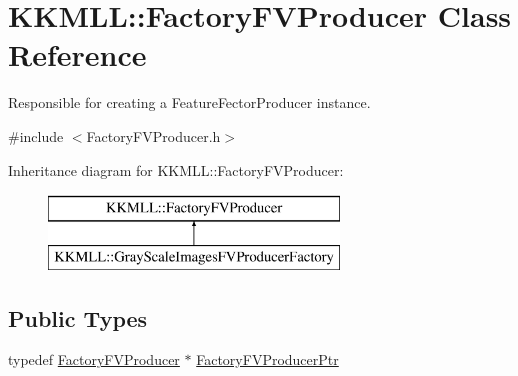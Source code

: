 \hypertarget{class_k_k_m_l_l_1_1_factory_f_v_producer}{}\section{K\+K\+M\+LL\+:\+:Factory\+F\+V\+Producer Class Reference}
\label{class_k_k_m_l_l_1_1_factory_f_v_producer}


Responsible for creating a Feature\+Fector\+Producer instance.  




{\ttfamily \#include $<$Factory\+F\+V\+Producer.\+h$>$}

Inheritance diagram for K\+K\+M\+LL\+:\+:Factory\+F\+V\+Producer\+:\begin{figure}[H]
\begin{center}
\leavevmode
\includegraphics[height=2.000000cm]{class_k_k_m_l_l_1_1_factory_f_v_producer}
\end{center}
\end{figure}
\subsection*{Public Types}
\begin{DoxyCompactItemize}
\item 
typedef \hyperlink{class_k_k_m_l_l_1_1_factory_f_v_producer}{Factory\+F\+V\+Producer} $\ast$ \hyperlink{class_k_k_m_l_l_1_1_factory_f_v_producer_a5a9f1ef1b6789f2b6379a8cdb81ac964}{Factory\+F\+V\+Producer\+Ptr}
\end{DoxyCompactItemize}
